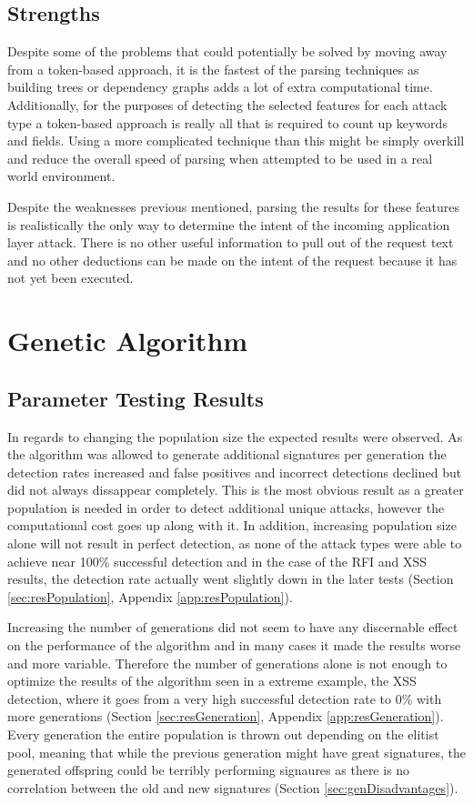 \subsection{Strengths}

Despite some of the problems that could potentially be solved by moving away from a token-based approach, it is the fastest of the parsing techniques as building trees or dependency graphs adds a lot of extra computational time.  Additionally, for the purposes of detecting the selected features for each attack type a token-based approach is really all that is required to count up keywords and fields.  Using a more complicated technique than this might be simply overkill and reduce the overall speed of parsing when attempted to be used in a real world environment.

Despite the weaknesses previous mentioned, parsing the results for these features is realistically the only way to determine the intent of the incoming application layer attack. There is no other useful information to pull out of the request text and no other deductions can be made on the intent of the request because it has not yet been executed.

\section{Genetic Algorithm}
\subsection{Parameter Testing Results}

In regards to changing the population size the expected results were observed.  As the algorithm was allowed to generate additional signatures per generation the detection rates increased and false positives and incorrect detections declined but did not always dissappear completely.  This is the most obvious result as a greater population is needed in order to detect additional unique attacks, however the computational cost goes up along with it.  In addition, increasing population size alone will not result in perfect detection, as none of the attack types were able to achieve near 100\% successful detection and in the case of the RFI and XSS results, the detection rate actually went slightly down in the later tests (Section \ref{sec:resPopulation}, Appendix \ref{app:resPopulation}).  

Increasing the number of generations did not seem to have any discernable effect on the performance of the algorithm and in many cases it made the results worse and more variable.  Therefore the number of generations alone is not enough to optimize the results of the algorithm seen in a extreme example, the XSS detection, where it goes from a very high successful detection rate to 0\% with more generations (Section \ref{sec:resGeneration}, Appendix \ref{app:resGeneration}).  Every generation the entire population is thrown out depending on the elitist pool, meaning that while the previous generation might have great signatures, the generated offspring could be terribly performing signaures as there is no correlation between the old and new signatures (Section \ref{sec:genDisadvantages}).

